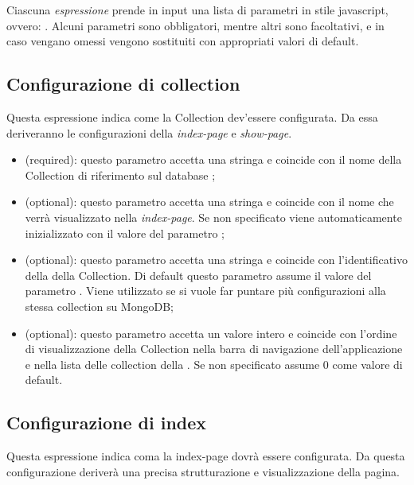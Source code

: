 Ciascuna \textit{espressione} prende in input una lista di parametri in stile javascript, ovvero: . Alcuni parametri sono obbligatori, mentre altri sono facoltativi, e in caso vengano omessi vengono sostituiti con appropriati valori di default.

\subsection{Configurazione di collection}

Questa espressione indica come la Collection dev'essere configurata. Da essa deriveranno le configurazioni della \textit{index-page} e \textit{show-page}.

\begin{itemize}

	\item \textbf{} (required): questo parametro accetta una stringa e coincide con il nome della Collection di riferimento sul database ;
	\item \textbf{} (optional): questo parametro accetta una stringa e coincide con il nome che verrà visualizzato nella \textit{index-page}. Se non specificato viene automaticamente inizializzato con il valore del parametro ;
	\item \textbf{} (optional): questo parametro accetta una stringa e coincide con l'identificativo della  della Collection. Di default questo parametro assume il valore del parametro . Viene utilizzato se si vuole far puntare più configurazioni alla stessa collection su MongoDB;
	\item \textbf{} (optional): questo parametro accetta un valore intero e coincide con l'ordine di visualizzazione della Collection nella barra di navigazione dell'applicazione e nella lista delle collection della . Se non specificato assume 0 come valore di default.

\end{itemize}

\subsection{Configurazione di index}

Questa espressione indica coma la index-page dovrà essere configurata. Da questa configurazione deriverà una precisa strutturazione e visualizzazione della pagina.

